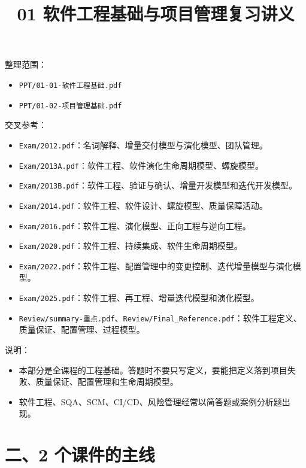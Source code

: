 \documentclass[UTF8,zihao=-4]{ctexart}
\title{01 软件工程基础与项目管理复习讲义}
\author{}
\date{}
\begin{document}
\maketitle
\tableofcontents
\newpage


整理范围：

\begin{itemize}
\item \texttt{PPT/01-01-软件工程基础.pdf}
\item \texttt{PPT/01-02-项目管理基础.pdf}
\end{itemize}

交叉参考：

\begin{itemize}
\item \texttt{Exam/2012.pdf}：名词解释、增量交付模型与演化模型、团队管理。
\item \texttt{Exam/2013A.pdf}：软件工程、软件演化生命周期模型、螺旋模型。
\item \texttt{Exam/2013B.pdf}：软件工程、验证与确认、增量开发模型和迭代开发模型。
\item \texttt{Exam/2014.pdf}：软件工程、软件设计、螺旋模型、质量保障活动。
\item \texttt{Exam/2016.pdf}：软件工程、演化模型、正向工程与逆向工程。
\item \texttt{Exam/2020.pdf}：软件工程、持续集成、软件生命周期模型。
\item \texttt{Exam/2022.pdf}：软件工程、配置管理中的变更控制、迭代增量模型与演化模型。
\item \texttt{Exam/2025.pdf}：软件工程、再工程、增量迭代模型和演化模型。
\item \texttt{Review/summary-重点.pdf}、\texttt{Review/Final\_Reference.pdf}：软件工程定义、质量保证、配置管理、过程模型。
\end{itemize}

说明：

\begin{itemize}
\item 本部分是全课程的工程基础。答题时不要只写定义，要能把定义落到项目失败、质量保证、配置管理和生命周期模型。
\item 软件工程、SQA、SCM、CI/CD、风险管理经常以简答题或案例分析题出现。
\end{itemize}

\section{二、2 个课件的主线}
\end{document}
